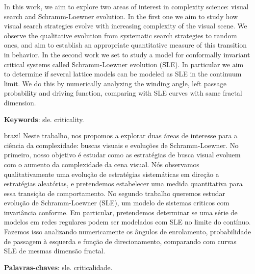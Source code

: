 \setlength{\absparsep}{18pt} %
\begin{resumo}
    In this work, we aim to explore two areas of interest in complexity science: visual
    search and Schramm-Loewner evolution.  In the first one we aim to study how
    visual search strategies evolve with increasing complexity of the visual
    scene. We observe the qualitative evolution from systematic search
    strategies to random ones, and aim to establish an appropriate
    quantitative measure of this transition in behavior.  In the second work we
    set to study a model for conformally invariant critical systems called
    Schramm-Loewner evolution (SLE). In particular we aim to determine if
    several lattice models can be modeled as SLE in the continuum limit. We do
    this by numerically analyzing the winding angle, left passage probability
    and driving function, comparing with SLE curves with same fractal dimension.
    \vspace{\onelineskip}
    \noindent 

    \textbf{Keywords}: sle. criticality.
\end{resumo}

\begin{resumo}[Resumo]
\begin{otherlanguage*}{brazil}
    Neste trabalho, nos propomos a explorar duas áreas de interesse para a ciência
    da complexidade: buscas visuais e evoluções de Schramm-Loewner. No primeiro,
    nosso objetivo é estudar como as estratégias de busca visual evoluem com
    o aumento da complexidade da cena visual. Nós observamos 
    qualitativamente uma evolução de estratégias sistemáticas em direção a
    estratégias aleatórias, e pretendemos estabelecer uma medida quantitativa
    para essa transição de comportamento. No segundo trabalho queremos estudar
    evolução de Schramm-Loewner (SLE), um modelo de sistemas criticos com invariância
    conforme. Em particular, pretendemos determinar se uma série de modelos em
    redes regulares podem ser modelados com SLE no limite do contínuo. Fazemos isso
    analizando numericamente os ângulos de enrolamento, probabilidade de passagem
    à esquerda e função de direcionamento, comparando com curvas SLE de mesmas
    dimensão fractal.
    \vspace{\onelineskip}
    \noindent 

    \textbf{Palavras-chaves}: sle. criticalidade.
\end{otherlanguage*}
\end{resumo}
